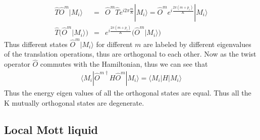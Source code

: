 \documentclass[reprint,prb,superscriptaddress]{revtex4-2}
\begin{document}
\begin{eqnarray}
\hat{T} \hat{O}^m |M_i\rangle &=& \hat{O}^m \hat{T} e^{i2\pi \frac{m}{K}} |M_i\rangle =\hat{O}^m e^{i \frac{2\pi(m+p_i)}{K} } |M_i\rangle \nonumber\\
\hat{T} \bigg(\hat{O}^m |M_i\rangle \bigg) &=&  e^{i \frac{2\pi(m+p_i)}{K} } \bigg( \hat{O}^m |M_i\rangle \bigg)
\end{eqnarray}
Thus different states $ \hat{O}^m |M_i\rangle$ for different $m$ are labeled by different eigenvalues of the translation operations, thus are orthogonal to each other. Now as the twist operator $\hat{O}$ commutes with the Hamiltonian, thus we can see that 
\begin{eqnarray}
\langle M_i| \hat{O}^{m \dagger}  H \hat{O}^m |M_i\rangle =\langle M_i|  H |M_i\rangle 
\end{eqnarray}
Thus the energy eigen values of all the orthogonal states are equal. Thus all the K mutually orthogonal states are degenerate.





\subsection{Local Mott liquid}
\end{document}
